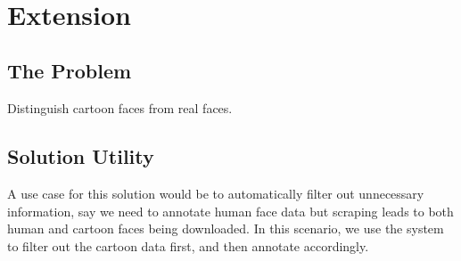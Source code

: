 \documentclass[10pt]{article}
\begin{document}
\begin{enumerate}
\begin{table}[H]
\caption{IIIT-CFW Dataset, best results}
\label{tab:4_cfw}
\end{table}

    $ $\\
\end{enumerate}

\section{Extension}
\subsection{The Problem}
Distinguish cartoon faces from real faces.\\

\subsection{Solution Utility}
A use case for this solution would be to automatically filter out unnecessary information, say we need to annotate human face data but scraping leads to both human and cartoon faces being downloaded. In this scenario, we use the system to filter out the cartoon data first, and then annotate accordingly.
\end{document}
